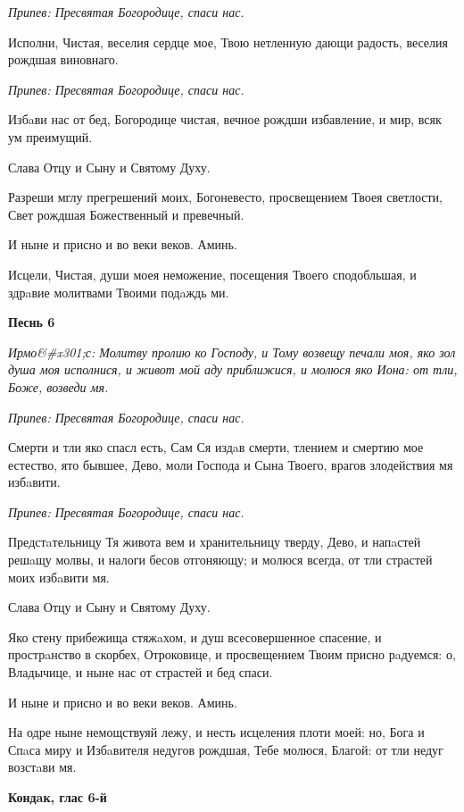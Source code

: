 \itshape Припев:\normalfont{} Пресвятая Богородице, спаси нас.


Исполни, Чистая, веселия сердце мое, Твою нетленную дающи радость, веселия рождшая виновнаго.


\itshape Припев:\normalfont{} Пресвятая Богородице, спаси нас.


Избaви нас от бед, Богородице чистая, вечное рождши избавление, и мир, всяк ум преимущий.


Слава Отцу и Сыну и Святому Духу.


Разреши мглу прегрешений моих, Богоневесто, просвещением Твоея светлости, Свет рождшая Божественный и превечный.


И ныне и присно и во веки веков. Аминь.


Исцели, Чистая, души моея неможение, посещения Твоего сподобльшая, и здрaвие молитвами Твоими подaждь ми.




\bfseries Песнь 6\normalfont{}


\itshape Ирмо&#x301;с:\normalfont{} Молитву пролию ко Господу, и Тому возвещу печали моя, яко зол душа моя исполнися, и живот мой аду приближися, и молюся яко Иона: от тли, Боже, возведи мя.


\itshape Припев:\normalfont{} Пресвятая Богородице, спаси нас.


Смерти и тли яко спасл есть, Сам Ся издaв смерти, тлением и смертию мое естество, ято бывшее, Дево, моли Господа и Сына Твоего, врагов злодействия мя избaвити.


\itshape Припев:\normalfont{} Пресвятая Богородице, спаси нас.


Предстaтельницу Тя живота вем и хранительницу тверду, Дево, и напaстей решaщу молвы, и налоги бесов отгоняющу; и молюся всегда, от тли страстей моих избaвити мя.


Слава Отцу и Сыну и Святому Духу.


Яко стену прибежища стяжaхом, и душ всесовершенное спасение, и прострaнство в скорбех, Отроковице, и просвещением Твоим присно рaдуемся: о, Владычице, и ныне нас от страстей и бед спаси.


И ныне и присно и во веки веков. Аминь.


На одре ныне немощствуяй лежу, и несть исцеления плоти моей: но, Бога и Спaса миру и Избaвителя недугов рождшая, Тебе молюся, Благой: от тли недуг возстaви мя.




\bfseries Кондaк, глас 6-й\normalfont{}


